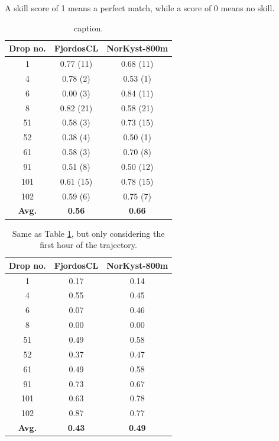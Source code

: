 A skill score of 1 means a perfect match, while a score of 0 means no skill. %

\begin{table}
\begin{center}
  \begin{tabular}{ | c | c | c |}
    \hline
    {\bf Drop no.} & {\bf FjordosCL} & {\bf NorKyst-800m} \\ \hline
    1 & 0.77 (11) & 0.68 (11) \\ 
    4 & 0.78 (2) & 0.53 (1) \\
    6 & 0.00 (3) & 0.84 (11) \\
    8 & 0.82 (21) & 0.58 (21) \\
    51 & 0.58 (3) & 0.73 (15) \\
    52 & 0.38 (4) & 0.50 (1) \\
    61 & 0.58 (3) & 0.70 (8) \\
    91 & 0.51 (8) & 0.50 (12) \\
    101 & 0.61 (15) & 0.78 (15) \\
    102 & 0.59 (6) & 0.75 (7) \\ \hline
    {\bf Avg.} & {\bf 0.56} & {\bf 0.66} \\
    \hline
  \end{tabular}
\caption{caption.}
\label{tab:skillscore_full}
\end{center}
\end{table}

\begin{table}
\begin{center}
  \begin{tabular}{ | c | c | c |}
    \hline
    {\bf Drop no.} & {\bf FjordosCL} & {\bf NorKyst-800m} \\ \hline
    1 & 0.17 & 0.14 \\ 
    4 & 0.55 & 0.45 \\
    6 & 0.07 & 0.46 \\
    8 & 0.00 & 0.00 \\
    51 & 0.49 & 0.58 \\
    52 & 0.37 & 0.47 \\
    61 & 0.49 & 0.58 \\
    91 & 0.73 & 0.67 \\
    101 & 0.63 & 0.78 \\
    102 & 0.87 & 0.77 \\ \hline
    {\bf Avg.} & {\bf 0.43} & {\bf 0.49} \\
    \hline
  \end{tabular}
\caption{Same as Table \ref{tab:skillscore_full}, but only considering the first hour of the trajectory.}
\label{tab:skillscore_1hr}
\end{center}
\end{table}


